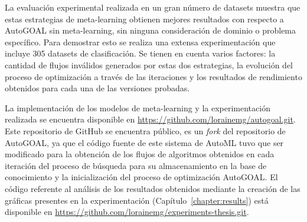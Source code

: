 \begin{conclusions}
La evaluación experimental realizada en un gran número de datasets muestra que estas estrategias de meta-learning obtienen mejores resultados con respecto a AutoGOAL sin meta-learning, sin ninguna consideración de dominio o problema específico. Para demostrar esto se realiza una extensa experimentación que incluye 305 datasets de clasificación. Se tienen en cuenta varios factores: la cantidad de flujos inválidos generados por estas dos estrategias, la evolución del proceso de optimización a través de las iteraciones y los resultados de rendimiento obtenidos para cada una de las versiones probadas.

La implementación de los modelos de meta-learning y la experimentación realizada se encuentra disponible en \url{https://github.com/lorainemg/autogoal.git}. Este repositorio de GitHub se encuentra público, es un \textit{fork} del repositorio de AutoGOAL, ya que el código fuente de este sistema de AutoML tuvo que ser modificado para la obtención de los flujos de algoritmos obtenidos en cada iteración del proceso de búsqueda para su almacenamiento en la base de conocimiento y la inicialización del proceso de optimización AutoGOAL. El código referente al análisis de los resultados obtenidos mediante la creación de las gráficas presentes en la experimentación (Capítulo~\ref{chapter:results}) está disponible en \url{https://github.com/lorainemg/experiments-thesis.git}.

\end{conclusions}
